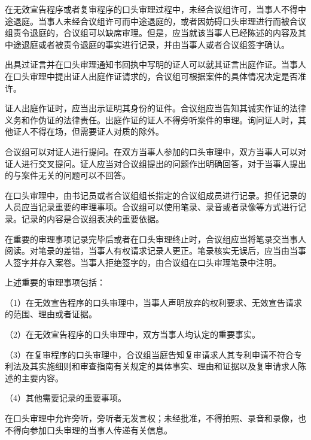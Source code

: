 在无效宣告程序或者复审程序的口头审理过程中，未经合议组许可，当事人不得中途退庭。当事人未经合议组许可而中途退庭的，或者因妨碍口头审理进行而被合议组责令退庭的，合议组可以缺席审理。但是，应当就该当事人已经陈述的内容及其中途退庭或者被责令退庭的事实进行记录，并由当事人或者合议组签字确认。

出具过证言并在口头审理通知书回执中写明的证人可以就其证言出庭作证。当事人在口头审理中提出证人出庭作证请求的，合议组可根据案件的具体情况决定是否准许。

证人出庭作证时，应当出示证明其身份的证件。合议组应当告知其诚实作证的法律义务和作伪证的法律责任。出庭作证的证人不得旁听案件的审理。询问证人时，其他证人不得在场，但需要证人对质的除外。

合议组可以对证人进行提问。在双方当事人参加的口头审理中，双方当事人可以对证人进行交叉提问。证人应当对合议组提出的问题作出明确回答，对于当事人提出的与案件无关的问题可以不回答。

在口头审理中，由书记员或者合议组组长指定的合议组成员进行记录。担任记录的人员应当记录重要的审理事项。合议组可以使用笔录、录音或者录像等方式进行记录。记录的内容是合议组表决的重要依据。

在重要的审理事项记录完毕后或者在口头审理终止时，合议组应当将笔录交当事人阅读。对笔录的差错，当事人有权请求记录人更正。笔录核实无误后，应当由当事人签字并存入案卷。当事人拒绝签字的，由合议组在口头审理笔录中注明。

上述重要的审理事项包括：

{\setlength{\parindent}{17.1bp}（1）在无效宣告程序的口头审理中，当事人声明放弃的权利要求、无效宣告请求的范围、理由或者证据。\par}

{\setlength{\parindent}{17.1bp}（2）在无效宣告程序的口头审理中，双方当事人均认定的重要事实。\par}

{\setlength{\parindent}{17.1bp}（3）在复审程序的口头审理中，合议组当庭告知复审请求人其专利申请不符合专利法及其实施细则和审查指南有关规定的具体事实、理由和证据以及复审请求人陈述的主要内容。\par}

{\setlength{\parindent}{17.1bp}（4）其他需要记录的重要事项。\par}

在口头审理中允许旁听，旁听者无发言权；未经批准，不得拍照、录音和录像，也不得向参加口头审理的当事人传递有关信息。

